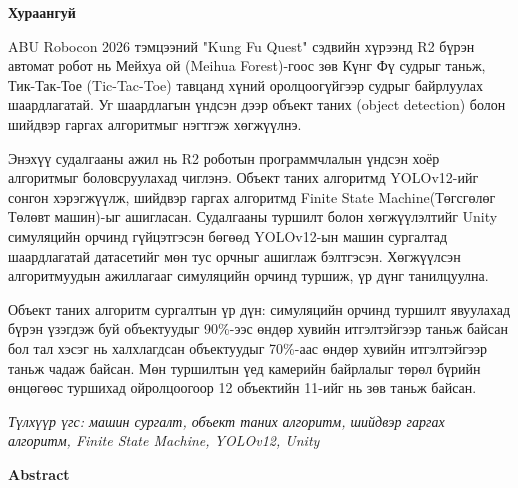 
\vspace{10mm}

\begin{center}
\textbf{\large Хураангуй}
\end{center}

\sloppy

ABU Robocon 2026 тэмцээний "Kung Fu Quest" сэдвийн хүрээнд R2 бүрэн автомат робот нь Мейхуа ой (Meihua Forest)-гоос зөв Күнг Фү судрыг таньж, Тик-Так-Тое (Tic-Tac-Toe) тавцанд хүний оролцоогүйгээр судрыг байрлуулах шаардлагатай. Уг шаардлагын үндсэн дээр объект таних (object detection) болон шийдвэр гаргах алгоритмыг нэгтгэж хөгжүүлнэ.

Энэхүү судалгааны ажил нь R2 роботын программчлалын үндсэн хоёр алгоритмыг боловсруулахад чиглэнэ. Объект таних алгоритмд YOLOv12-ийг сонгон хэрэгжүүлж, шийдвэр гаргах алгоритмд Finite State Machine(Төгсгөлөг Төлөвт машин)-ыг ашигласан. Судалгааны туршилт болон хөгжүүлэлтийг Unity симуляцийн орчинд гүйцэтгэсэн бөгөөд YOLOv12-ын машин сургалтад шаардлагатай датасетийг мөн тус орчныг ашиглаж бэлтгэсэн. Хөгжүүлсэн алгоритмуудын ажиллагааг симуляцийн орчинд туршиж, үр дүнг танилцуулна.

Объект таних алгоритм сургалтын үр дүн: симуляцийн орчинд туршилт явуулахад бүрэн үзэгдэж буй объектуудыг 90\%-ээс өндөр хувийн итгэлтэйгээр таньж байсан бол тал хэсэг нь халхлагдсан объектуудыг 70\%-аас өндөр хувийн итгэлтэйгээр таньж чадаж байсан. Мөн туршилтын үед камерийн байрлалыг төрөл бүрийн өнцөгөөс туршихад ойролцоогоор 12 объектийн 11-ийг нь зөв таньж байсан.

\vspace{3mm}
\textit{Түлхүүр үгс: машин сургалт, объект таних алгоритм, шийдвэр гаргах алгоритм, Finite State Machine, YOLOv12, Unity}

\vspace{10mm}

\begin{center}
\textbf{\large Abstract}
\end{center}

